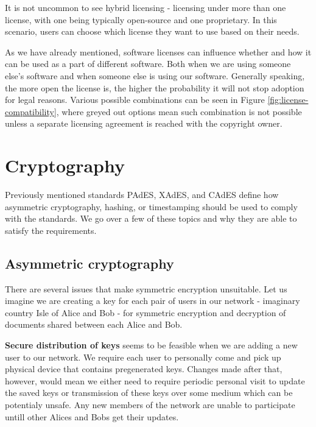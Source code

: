 \documentclass[thesismargins, english, thesislinespacing, twoside, openright, upjsfrontpage]{rnthesis}
\begin{document}
It is not uncommon to see hybrid licensing - licensing under more than one license, with one being typically open-source and one proprietary.
In this scenario, users can choose which license they want to use based on their needs.


As we have already mentioned, software licenses can influence whether and how it can be used as a part of different software.
Both when we are using someone else's software and when someone else is using our software.
Generally speaking, the more open the license is, the higher the probability it will not stop adoption for legal reasons.
Various possible combinations can be seen in Figure \ref{fig:license-compatibility}, where greyed out options mean such combination is not possible unless a separate licensing agreement is reached with the copyright owner.


\section{Cryptography} \label{cryptography}

Previously mentioned standards PAdES, XAdES, and CAdES define how asymmetric cryptography, hashing, or timestamping should be used to comply with the standards.
We go over a few of these topics and why they are able to satisfy the requirements.

\subsection{Asymmetric cryptography}

There are several issues that make symmetric encryption unsuitable. Let us imagine we are creating a key for each pair of users in our network - imaginary country Isle of Alice and Bob - for symmetric encryption and decryption of documents shared between each Alice and Bob.

\textbf{Secure distribution of keys} seems to be feasible when we are adding a new user to our network. We require each user to personally come and pick up physical device that contains pregenerated keys. Changes made after that, however, would mean we either need to require periodic personal visit to update the saved keys or transmission of these keys over some medium which can be potentialy unsafe. Any new members of the network are unable to participate untill other Alices and Bobs get their updates.
\end{document}

